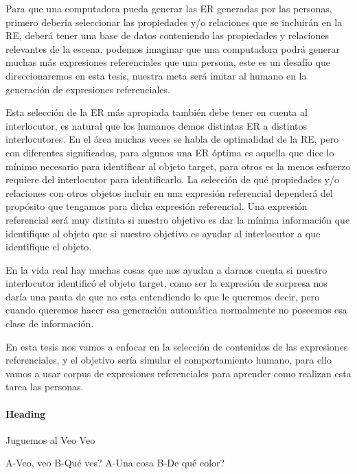  Para que una computadora pueda generar las ER generadas por las personas, primero deber\'ia seleccionar las propiedades y/o relaciones que se incluir\'an en la RE, deber\'a tener una base de datos conteniendo las propiedades y relaciones relevantes de la escena, podemos imaginar que una computadora podr\'a generar muchas m\'as expresiones referenciales que una persona, este es un desaf\'io que direccionaremos en esta tesis, nuestra meta ser\'a imitar al humano en la generaci\'on de expresiones referenciales. 

Esta selecci\'on de la ER m\'as apropiada tambi\'en debe tener en cuenta al interlocutor, es natural que los humanos demos distintas ER a distintos interlocutores. En el \'area muchas veces se habla de optimalidad de la RE, pero con diferentes significados, para algunos una ER \'optima es aquella que dice lo m\'inimo necesario para identificar al objeto target, para otros es la menos esfuerzo requiere del interlocutor para identificarlo.
La selecci\'on de qu\'e propiedades y/o relaciones con otros objetos incluir en una expresi\'on referencial depender\'a del prop\'osito que tengamos para dicha expresi\'on referencial. Una expresi\'on referencial ser\'a muy distinta si nuestro objetivo es dar la m\'inima informaci\'on que identifique al objeto que si nuestro objetivo es ayudar al interlocutor a que identifique el objeto.

En la vida real hay muchas cosas que nos ayudan a darnos cuenta si nuestro interlocutor identific\'o el objeto target, como ser la expresi\'on de sorpresa nos dar\'ia una pauta de que no esta entendiendo lo que le queremos decir, pero cuando queremos hacer esa generaci\'on autom\'atica normalmente no poseemos esa clase de informaci\'on.

En esta tesis nos vamos a enfocar en la selecci\'on de contenidos de las expresiones referenciales, y el objetivo ser\'ia simular el comportamiento humano, para ello vamos a usar corpus de expresiones referenciales para aprender como realizan esta tarea las personas.
 

\paragraph{Heading} Juguemos al Veo Veo

A-Veo, veo
B-Qu\'e ves?
A-Una cosa
B-De qu\'e color?

